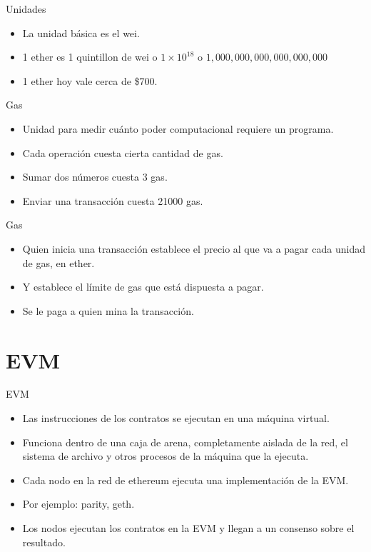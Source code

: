 \documentclass[10pt]{beamer}
\begin{document}
\begin{frame}{Unidades}
  \begin{itemize}
    \item La unidad básica es el wei.
    \item 1 ether es 1 quintillon de wei o $1 \times 10^{18}$ o $1,000,000,000,000,000,000$
    \item 1 ether hoy vale cerca de \$700.
  \end{itemize}
\end{frame}

\begin{frame}{Gas}
  \begin{itemize}
    \item Unidad para medir cuánto poder computacional requiere un programa.
    \item Cada operación cuesta cierta cantidad de gas.
    \item Sumar dos números cuesta 3 gas.
    \item Enviar una transacción cuesta 21000 gas.
  \end{itemize}
\end{frame}

\begin{frame}{Gas}
  \begin{itemize}
    \item Quien inicia una transacción establece el precio al que va a pagar cada unidad de gas, en ether.
    \item Y establece el límite de gas que está dispuesta a pagar.
    \item Se le paga a quien mina la transacción.
  \end{itemize}
\end{frame}

\section{EVM}

\begin{frame}{EVM}
  \begin{itemize}
    \item Las instrucciones de los contratos se ejecutan en una máquina virtual.
    \item Funciona dentro de una caja de arena, completamente aislada de la red, el sistema de archivo y otros procesos de la máquina que la ejecuta.
    \item Cada nodo en la red de ethereum ejecuta una implementación de la EVM.
    \item Por ejemplo: parity, geth.
    \item Los nodos ejecutan los contratos en la EVM y llegan a un consenso sobre el resultado.
  \end{itemize}
\end{frame}
\end{document}
